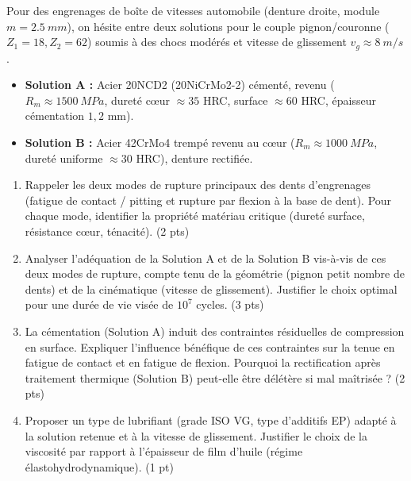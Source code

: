 \documentclass[11pt]{article}
\begin{document}
\begin{exercice}
Pour des engrenages de boîte de vitesses automobile (denture droite, module $m=\SI{2,5}{mm}$), on hésite entre deux solutions pour le couple pignon/couronne ($Z_1=18, Z_2=62$) soumis à des chocs modérés et vitesse de glissement $v_g \approx \SI{8}{m/s}$.
\begin{itemize}
    \item \textbf{Solution A :} Acier 20NCD2 (20NiCrMo2-2) cémenté, revenu ($R_m \approx \SI{1500}{MPa}$, dureté cœur $\approx 35$ HRC, surface $\approx 60$ HRC, épaisseur cémentation $1,2$ mm).
    \item \textbf{Solution B :} Acier 42CrMo4 trempé revenu au cœur ($R_m \approx \SI{1000}{MPa}$, dureté uniforme $\approx 30$ HRC), denture rectifiée.
\end{itemize}
\begin{enumerate}
    \item Rappeler les deux modes de rupture principaux des dents d'engrenages (fatigue de contact / pitting et rupture par flexion à la base de dent). Pour chaque mode, identifier la propriété matériau critique (dureté surface, résistance cœur, ténacité). (2 pts)
    \item Analyser l'adéquation de la Solution A et de la Solution B vis-à-vis de ces deux modes de rupture, compte tenu de la géométrie (pignon petit nombre de dents) et de la cinématique (vitesse de glissement). Justifier le choix optimal pour une durée de vie visée de $10^7$ cycles. (3 pts)
    \item La cémentation (Solution A) induit des contraintes résiduelles de compression en surface. Expliquer l'influence bénéfique de ces contraintes sur la tenue en fatigue de contact et en fatigue de flexion. Pourquoi la rectification après traitement thermique (Solution B) peut-elle être délétère si mal maîtrisée ? (2 pts)
    \item Proposer un type de lubrifiant (grade ISO VG, type d'additifs EP) adapté à la solution retenue et à la vitesse de glissement. Justifier le choix de la viscosité par rapport à l'épaisseur de film d'huile (régime élastohydrodynamique). (1 pt)
\end{enumerate}
\end{exercice}
\end{document}
